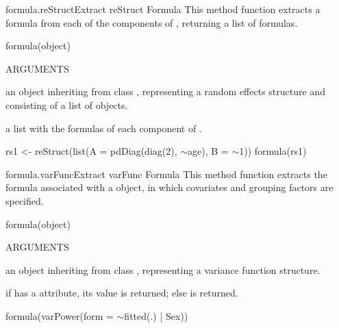 \documentclass[pdftex]{article} \usepackage{url,graphicx}
\renewcommand{\Twiddle}{\mbox{\(\sim\)}}
\begin{document}
\begin{Helpfile}{formula.reStruct}{Extract reStruct Formula}
This method function extracts a formula from each of the 
components of , returning a list of formulas.
\begin{Example}
formula(object)
\end{Example}
\begin{Argument}{ARGUMENTS}
\item[\Co{object:}]
an object inheriting from class ,
representing a random effects structure and consisting of a list of
 objects.
\end{Argument}
a list with the formulas of each component of .
\need 15pt
\vspace{-16pt} 
\begin{Example}
rs1 <- reStruct(list(A = pdDiag(diag(2), \Twiddle age), B = \Twiddle 1))
formula(rs1)
\end{Example}
\end{Helpfile}
\begin{Helpfile}{formula.varFunc}{Extract varFunc Formula}
This method function extracts the formula associated with a
 object, in which covariates and grouping factors are
specified.
\begin{Example}
formula(object)
\end{Example}
\begin{Argument}{ARGUMENTS}
\item[\Co{object:}]
an object inheriting from class ,
representing a variance function structure.
\end{Argument}
if  has a  attribute, its value is
returned; else  is returned.
\need 15pt
\vspace{-16pt} 
\begin{Example}
formula(varPower(form = \Twiddle fitted(.) | Sex))
\end{Example}
\end{Helpfile}
\end{document}
